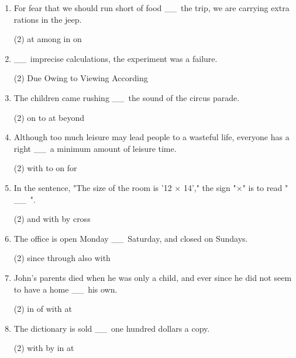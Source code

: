 \documentclass{yufa}
\newcommand\ttu{ \_\_\ }
\begin{document}
\begin{enumerate}
\item For fear that we should run short of food \ttu the trip, we are carrying extra rations in the jeep.
  \begin{tasks}(2)
    \task at
    \task among
    \task in
    \task on
  \end{tasks}

\item \ttu imprecise calculations, the experiment was a failure.
  \begin{tasks}(2)
    \task Due
    \task Owing to
    \task Viewing
    \task According
  \end{tasks}

\item The children came rushing \ttu the sound of the circus parade.
  \begin{tasks}(2)
    \task on
    \task to
    \task at
    \task beyond
  \end{tasks}

\item Although too much leisure may lead people to a wasteful life, everyone has a right \ttu a minimum amount of leisure time.
  \begin{tasks}(2)
    \task with
    \task to
    \task on
    \task for
  \end{tasks}

\item In the sentence, "The size of the room is '12 × 14'," the sign "×" is to read "\ttu".
  \begin{tasks}(2)
    \task and
    \task with
    \task by
    \task cross
  \end{tasks}

\item The office is open Monday \ttu Saturday, and closed on Sundays.
  \begin{tasks}(2)
    \task since
    \task through
    \task also
    \task with
  \end{tasks}

\item John's parents died when he was only a child, and ever since he did not seem to have a home \ttu his own.
  \begin{tasks}(2)
    \task in
    \task of
    \task with
    \task at
  \end{tasks}

\item The dictionary is sold \ttu one hundred dollars a copy.
  \begin{tasks}(2)
    \task with
    \task by
    \task in
    \task at
  \end{tasks}


\end{enumerate}
\end{document}
